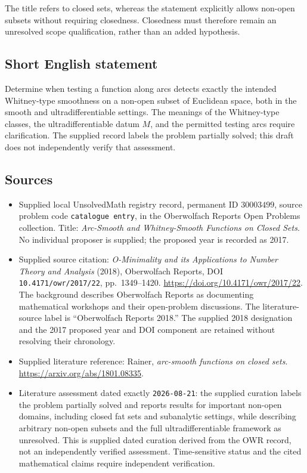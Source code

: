 \documentclass[11pt]{article}
\begin{document}
The title refers to closed sets, whereas the statement explicitly allows non-open subsets without requiring closedness. Closedness must therefore remain an unresolved scope qualification, rather than an added hypothesis.
\subsection{Short English statement}
Determine when testing a function along arcs detects exactly the intended Whitney-type smoothness on a non-open subset of Euclidean space, both in the smooth and ultradifferentiable settings. The meanings of the Whitney-type classes, the ultradifferentiable datum \(M\), and the permitted testing arcs require clarification. The supplied record labels the problem partially solved; this draft does not independently verify that assessment.
\subsection{Sources}
\begin{itemize}
\item Supplied local UnsolvedMath registry record, permanent ID \(30003499\), source problem code \texttt{catalogue entry}, in the Oberwolfach Reports Open Problems collection. Title: \emph{Arc-Smooth and Whitney-Smooth Functions on Closed Sets}. No individual proposer is supplied; the proposed year is recorded as 2017.
\item Supplied source citation: \emph{O-Minimality and its Applications to Number Theory and Analysis} (2018), Oberwolfach Reports, DOI \texttt{10.4171/owr/2017/22}, pp.\ 1349--1420. \url{https://doi.org/10.4171/owr/2017/22}. The background describes Oberwolfach Reports as documenting mathematical workshops and their open-problem discussions. The literature-source label is ``Oberwolfach Reports 2018.'' The supplied 2018 designation and the 2017 proposed year and DOI component are retained without resolving their chronology.
\item Supplied literature reference: Rainer, \emph{arc-smooth functions on closed sets}. \url{https://arxiv.org/abs/1801.08335}.
\item Literature assessment dated exactly \texttt{2026-08-21}: the supplied curation labels the problem partially solved and reports results for important non-open domains, including closed fat sets and subanalytic settings, while describing arbitrary non-open subsets and the full ultradifferentiable framework as unresolved. This is supplied dated curation derived from the OWR record, not an independently verified assessment. Time-sensitive status and the cited mathematical claims require independent verification.
\end{itemize}
\end{document}
